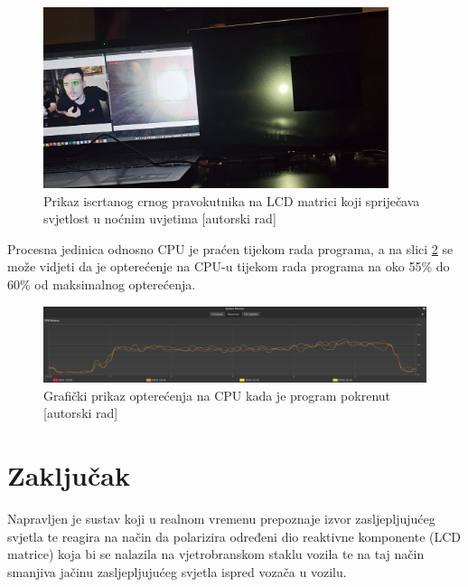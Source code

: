 \documentclass{foi}
\begin{document}
\begin{figure}[h!]
    \centering
    \includegraphics[width=0.9\textwidth]{slike/prototip_mrak}
    \caption{Prikaz iscrtanog crnog pravokutnika na LCD matrici koji spriječava svjetlost u noćnim uvjetima [autorski rad]}
    \label{fig:prototip_mrak}
\end{figure}

Procesna jedinica odnosno CPU je praćen tijekom rada programa, a na slici \ref{fig:prototip_cpu} se može vidjeti da je opterećenje na CPU-u tijekom rada programa na oko 55\% do 60\% od maksimalnog opterećenja.

\begin{figure}[h!]
    \centering
    \includegraphics[width=1\textwidth]{slike/prototip_cpu}
    \caption{Grafički prikaz opterećenja na CPU kada je program pokrenut [autorski rad]}
    \label{fig:prototip_cpu}
\end{figure}

\pagebreak
\chapter{Zaključak}

Napravljen je sustav koji u realnom vremenu prepoznaje izvor zasljepljujućeg svjetla te reagira na način da polarizira određeni dio reaktivne komponente (LCD matrice) koja bi se nalazila na vjetrobranskom staklu vozila te na taj način smanjiva jačinu zasljepljujućeg svjetla ispred vozača u vozilu.
\end{document}
